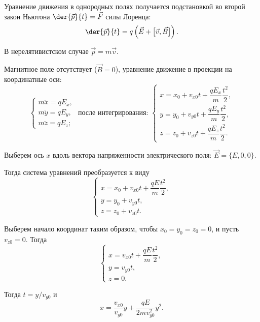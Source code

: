
Уравнение движения в однородных полях получается подстановкой во второй закон
Ньютона \( \displaystyle \der{\vec{p}}{t} = \vec{F} \) силы Лоренца:
\[
  \der{\vec{p}}{t} = q\left( \vec{E} + \big[ \vec{v}, \vec{B} \big] \right).
\]

В нерелятивистском случае \( \vec{p} = m\vec{v} \).


Магнитное поле отсутствует (\( \vec{B} = 0 \)), уравнение движение в проекции на
координатные оси:
\[
  \left\{
    \begin{array}{l}
      m\ddot{x} = qE_x, \\
      m\ddot{y} = qE_y, \\
      m\ddot{z} = qE_z;
    \end{array}
  \right.
  \text{ после интегрирования: }
  \left\{
    \begin{array}{l}
      x = x_0 + v_{x0}t + \dfrac{qE_x}{m}\dfrac{t^2}{2}, \\[.5em]
      y = y_0 + v_{y0}t + \dfrac{qE_y}{m}\dfrac{t^2}{2}, \\[.5em]
      z = z_0 + v_{z0}t + \dfrac{qE_z}{m}\dfrac{t^2}{2}.
    \end{array}
  \right.
\]

Выберем ось \( x \) вдоль вектора напряженности электрического поля:
\( \vec{E} = \big\{ E, 0, 0 \big\} \).

Тогда система уравнений преобразуется к виду
\[
  \left\{
    \begin{array}{l}
      x = x_0 + v_{x0}t + \dfrac{qE}{m}\dfrac{t^2}{2}, \\[.5em]
      y = y_0 + v_{y0}t, \\
      z = z_0 + v_{z0}t.
    \end{array}
  \right.
\]

Выберем начало координат таким образом, чтобы \( x_0 = y_0 = z_0 = 0 \), и пусть
\( v_{z0} = 0 \). Тогда
\[
  \left\{
    \begin{array}{l}
      x = v_{x0}t + \dfrac{qE}{m}\dfrac{t^2}{2}, \\[.5em]
      y = v_{y0}t, \\
      z = 0.
    \end{array}
  \right.
\]

Тогда \( t = y / v_{y0} \) и
\[
  x = \frac{v_{x0}}{v_{y0}}y + \frac{qE}{2mv_{y0}^2}y^2.
\]

